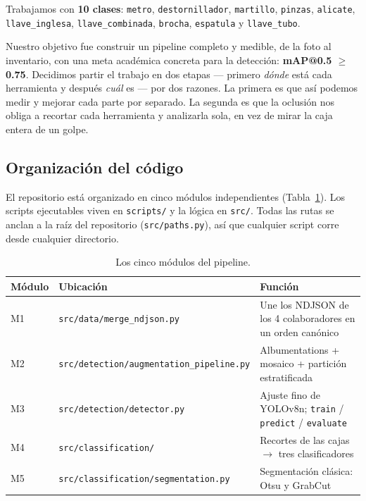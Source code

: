 \documentclass[11pt,a4paper]{article}
\newcommand{\clase}[1]{\texttt{#1}}
\begin{document}
Trabajamos con \textbf{10 clases}: \clase{metro}, \clase{destornillador}, \clase{martillo},
\clase{pinzas}, \clase{alicate}, \clase{llave\_inglesa}, \clase{llave\_combinada},
\clase{brocha}, \clase{espatula} y \clase{llave\_tubo}.

Nuestro objetivo fue construir un pipeline completo y medible, de la foto al inventario, con una
meta académica concreta para la detección: \textbf{mAP@0.5 $\geq$ 0.75}. Decidimos partir el
trabajo en dos etapas --- primero \emph{dónde} está cada herramienta y después \emph{cuál} es ---
por dos razones. La primera es que así podemos medir y mejorar cada parte por separado. La
segunda es que la oclusión nos obliga a recortar cada herramienta y analizarla sola, en vez de
mirar la caja entera de un golpe.

\subsection{Organización del código}

El repositorio está organizado en cinco módulos independientes (Tabla~\ref{tab:modulos}). Los
scripts ejecutables viven en \texttt{scripts/} y la lógica en \texttt{src/}. Todas las rutas se
anclan a la raíz del repositorio (\texttt{src/paths.py}), así que cualquier script corre desde
cualquier directorio.

\begin{table}[htbp]
\centering
\caption{Los cinco módulos del pipeline.}
\label{tab:modulos}
\small
\begin{tabularx}{\textwidth}{@{}l l X@{}}
\toprule
\textbf{Módulo} & \textbf{Ubicación} & \textbf{Función} \\
\midrule
M1 & \texttt{src/data/merge\_ndjson.py} & Une los NDJSON de los 4 colaboradores en un orden canónico \\
M2 & \texttt{src/detection/augmentation\_pipeline.py} & Albumentations + mosaico + partición estratificada \\
M3 & \texttt{src/detection/detector.py} & Ajuste fino de YOLOv8n; \texttt{train} / \texttt{predict} / \texttt{evaluate} \\
M4 & \texttt{src/classification/} & Recortes de las cajas $\to$ tres clasificadores \\
M5 & \texttt{src/classification/segmentation.py} & Segmentación clásica: Otsu y GrabCut \\
\bottomrule
\end{tabularx}
\end{table}
\end{document}
